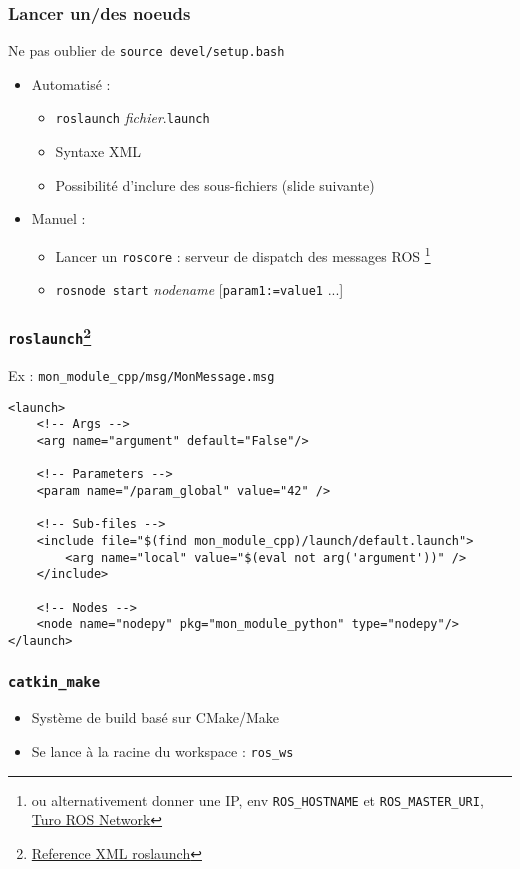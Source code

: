 \documentclass{beamer}
\begin{document}
\begin{frame}
\frametitle{Lancer un/des noeuds}
Ne pas oublier de \texttt{source devel/setup.bash}
\begin{itemize}
    \item Automatisé : \begin{itemize}
        \item \texttt{roslaunch} \textit{fichier}.\texttt{launch}
        \item Syntaxe XML
        \item Possibilité d'inclure des sous-fichiers (slide suivante)
    \end{itemize}
    \item Manuel : \begin{itemize}
        \item Lancer un \texttt{roscore} : serveur de dispatch des messages ROS \footnote{ou
        alternativement donner une IP, env \texttt{ROS\_HOSTNAME} et \texttt{ROS\_MASTER\_URI},
        \href{http://wiki.ros.org/ROS/NetworkSetup}{Turo ROS Network}}
        \item \texttt{rosnode start} \textit{nodename} [\texttt{param1:=value1} ...]
    \end{itemize}
\end{itemize}
\end{frame}

\begin{frame}[fragile]
\frametitle{\texttt{roslaunch}\footnote{\href{http://wiki.ros.org/roslaunch/XML
}{Reference XML roslaunch}}}
Ex : \texttt{mon\_module\_cpp/msg/MonMessage.msg}

\begin{verbatim}
<launch>
    <!-- Args -->
    <arg name="argument" default="False"/>

    <!-- Parameters -->
    <param name="/param_global" value="42" />

    <!-- Sub-files -->
    <include file="$(find mon_module_cpp)/launch/default.launch">
        <arg name="local" value="$(eval not arg('argument'))" />
    </include>

    <!-- Nodes -->
    <node name="nodepy" pkg="mon_module_python" type="nodepy"/>
</launch>
\end{verbatim}
\end{frame}


\begin{frame}
\frametitle{\texttt{catkin\_make}}
\begin{itemize}
    \item Système de build basé sur CMake/Make
    \item Se lance à la racine du workspace : \texttt{ros\_ws}
\end{itemize}
\end{frame}
    
\end{document}
